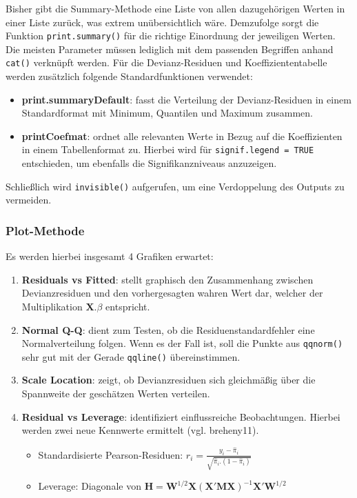 \documentclass[12pt,]{article}
\providecommand{\tightlist}{%
  \setlength{\itemsep}{0pt}\setlength{\parskip}{0pt}}
\begin{document}
Bisher gibt die Summary-Methode eine Liste von allen dazugehörigen
Werten in einer Liste zurück, was extrem unübersichtlich wäre.
Demzufolge sorgt die Funktion \texttt{print.summary()} für die richtige
Einordnung der jeweiligen Werten. Die meisten Parameter müssen lediglich
mit dem passenden Begriffen anhand \texttt{cat()} verknüpft werden. Für
die Devianz-Residuen und Koeffiziententabelle werden zusätzlich folgende
Standardfunktionen verwendet:

\begin{itemize}
\tightlist
\item
  \textbf{print.summaryDefault}: fasst die Verteilung der
  Devianz-Residuen in einem Standardformat mit Minimum, Quantilen und
  Maximum zusammen.
\item
  \textbf{printCoefmat}: ordnet alle relevanten Werte in Bezug auf die
  Koeffizienten in einem Tabellenformat zu. Hierbei wird für
  \texttt{signif.legend\ =\ TRUE} entschieden, um ebenfalls die
  Signifikanzniveaus anzuzeigen.
\end{itemize}

Schließlich wird \texttt{invisible()} aufgerufen, um eine Verdoppelung
des Outputs zu vermeiden.

\subsubsection{Plot-Methode}\label{plot-methode}

Es werden hierbei insgesamt 4 Grafiken erwartet:

\begin{enumerate}
\def\labelenumi{\arabic{enumi}.}
\tightlist
\item
  \textbf{Residuals vs Fitted}: stellt graphisch den Zusammenhang
  zwischen Devianzresiduen und den vorhergesagten wahren Wert dar,
  welcher der Multiplikation \(\mathbf{X}.\beta\) entspricht.
\item
  \textbf{Normal Q-Q}: dient zum Testen, ob die Residuenstandardfehler
  eine Normalverteilung folgen. Wenn es der Fall ist, soll die Punkte
  aus \texttt{qqnorm()} sehr gut mit der Gerade \texttt{qqline()}
  übereinstimmen.
\item
  \textbf{Scale Location}: zeigt, ob Devianzresiduen sich gleichmäßig
  über die Spannweite der geschätzen Werten verteilen.
\item
  \textbf{Residual vs Leverage}: identifiziert einflussreiche
  Beobachtungen. Hierbei werden zwei neue Kennwerte ermittelt (vgl.
  breheny11).

  \begin{itemize}
  \item
    Standardisierte Pearson-Residuen:
    \(r_i = \frac{y_i-\hat{\pi}_i}{\sqrt{\hat{\pi}_i.(1-\hat{\pi}_i)}}\)
  \item
    Leverage: Diagonale von
    \(\mathbf{H} = \mathbf{W}^{1/2} \mathbf{X}(\mathbf{X'}\mathbf{M}\mathbf{X})^{{-1}}\mathbf{X'}\mathbf{W}^{1/2}\)
  \end{itemize}
\end{enumerate}
\end{document}
